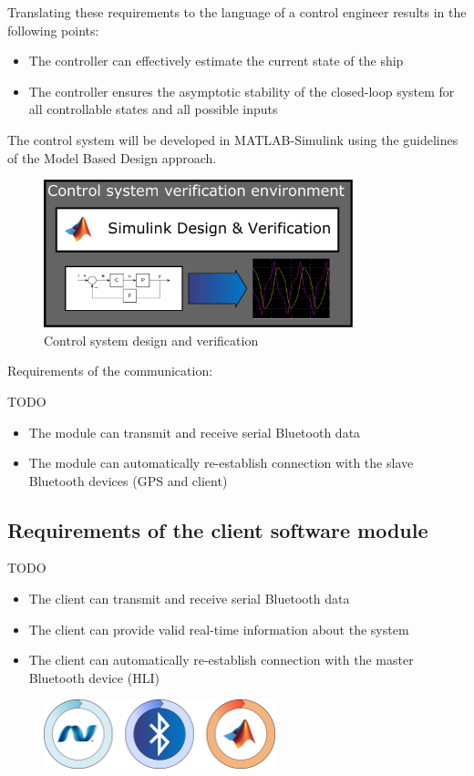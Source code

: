 Translating these requirements to the language of a control engineer results in the following points:

\begin{itemize}

\item The controller can effectively estimate the current state of the ship
\item The controller ensures the asymptotic stability of the closed-loop system for all controllable states and all possible inputs

\end{itemize}

The control system will be developed in MATLAB-Simulink using the guidelines of the Model Based Design approach.
\begin{figure}[H]
	\centering
	\includegraphics[width=0.8\textwidth]{img2/SimVer}
	\caption{Control system design and verification}
	\label{simver}
\end{figure}

Requirements of the communication:

TODO

\begin{itemize}

\item The module can transmit and receive serial Bluetooth data
\item The module can automatically re-establish connection with the slave Bluetooth devices (GPS and client)

\end{itemize}

\subsection{Requirements of the client software module}

TODO

\begin{itemize}

\item The client can transmit and receive serial Bluetooth data
\item The client can provide valid real-time information about the system
\item The client can automatically re-establish connection with the master Bluetooth device (HLI)

\end{itemize}

\begin{figure}[H]
	\centering
	\includegraphics[width=0.6\textwidth]{img2/VeriBadges}
	\caption{}
	\label{}
\end{figure}